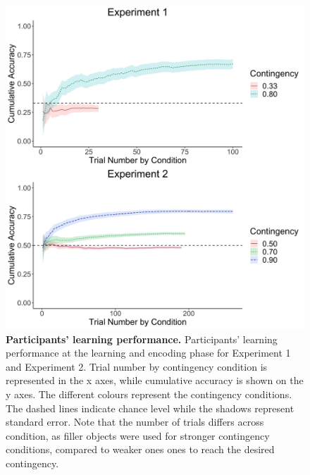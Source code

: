 \documentclass[a4paper,12pt]{article}
\begin{document}
\begin{figure}[ht!]
\centerline
{\includegraphics[width=1\textwidth]{figures/cumAccbySceneAll.jpg}}
\caption{\textbf{Participants' learning performance.} Participants' learning performance at the learning and encoding phase for Experiment 1 and Experiment 2. Trial number by contingency condition is represented in the x axes, while cumulative accuracy is shown on the y axes. The different colours represent the contingency conditions. The dashed lines indicate chance level while the shadows represent standard error. Note that the number of trials differs across condition, as filler objects were used for stronger contingency conditions, compared to weaker ones ones to reach the desired contingency.}
\label{fig:participantsLer}
\end{figure}
\end{document}
